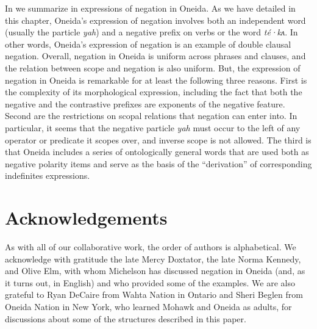 \documentclass[output=paper,colorlinks,citecolor=brown]{langscibook}
\begin{document}
In  we summarize in expressions of negation in Oneida.
As we have detailed in this chapter, Oneida's expression of negation involves both an independent word (usually the particle \textit{yah}) and a negative prefix on verbs or the word \textit{té·kʌ}. In other words, Oneida's expression of negation is an example of double clausal negation. Overall, negation in Oneida is uniform across phrases and clauses, and the relation between scope and negation is also uniform. But, the expression of negation in Oneida is remarkable for at least the following three reasons. First is the complexity of its morphological expression, including the fact that both the negative and the contrastive prefixes are exponents of the negative feature. Second are the restrictions on scopal relations that negation can enter into. In particular, it seems that the negative particle \textit{yah} must occur to the left of any operator or predicate it scopes over, and inverse scope is not allowed. The third is that Oneida includes a series of ontologically general words that are used both as negative polarity items and serve as the basis of the ``derivation'' of corresponding indefinites expressions.

\section*{Acknowledgements}
As with all of our collaborative work, the order of authors is alphabetical. We acknowledge with gratitude the late Mercy Doxtator, the late Norma Kennedy, and Olive Elm, with whom Michelson has discussed negation in Oneida (and, as it turns out, in English) and who provided some of the examples. We are also grateful to Ryan DeCaire from Wahta Nation in Ontario and Sheri Beglen from Oneida Nation in New York, who learned Mohawk and Oneida as adults, for discussions about some of the structures described in this paper.
\end{document}
